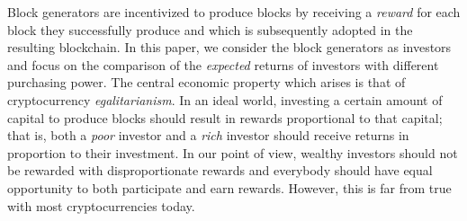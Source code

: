 Block generators are incentivized to produce blocks by receiving a
\emph{reward} for each block they successfully produce and which is
subsequently adopted in the resulting blockchain.
In this paper, we consider the block generators as investors and focus on the
comparison of the \emph{expected} returns of investors with different
purchasing power. The central economic property which arises is that of
cryptocurrency \emph{egalitarianism}. In an ideal world, investing a certain
amount of capital to produce blocks should result in rewards proportional to
that capital; that is, both a \emph{poor} investor and a \emph{rich} investor
should receive returns in proportion to their investment. In our point of view,
wealthy investors should not be rewarded
with disproportionate rewards and everybody should have equal opportunity to both participate
and earn rewards. However, this is far from true with most cryptocurrencies
today.

